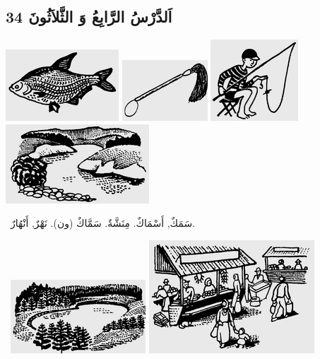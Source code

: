 \documentclass[a5paper]{article}
\begin{document}
\subsection[اَلدَّرْسُ الرَّابِعُ وَ الثَّلاَثُونَ 34]{اَلدَّرْسُ الرَّابِعُ وَ الثَّلاَثُونَ 34}
 \includegraphics[width=1.6665in,height=1.052in]{MuhammadBagauddinlatinized-img076.png}   \includegraphics[width=1.2602in,height=0.8957in]{MuhammadBagauddinlatinized-img077.png}   \includegraphics[width=1.2917in,height=1.198in]{MuhammadBagauddinlatinized-img078.png}   \includegraphics[width=2.1146in,height=1.1665in]{MuhammadBagauddinlatinized-img079.png} 

\ سَمَكٌ, أَسْمَاكٌ. مِنَشَّةٌ. سَمَّاكٌ (ون). نَهْرٌ, أَنْهُارٌ. 

\  \includegraphics[width=1.9898in,height=1.0835in]{MuhammadBagauddinlatinized-img080.png}   \includegraphics[width=2.4374in,height=1.6665in]{MuhammadBagauddinlatinized-img081.png} 
\end{document}
